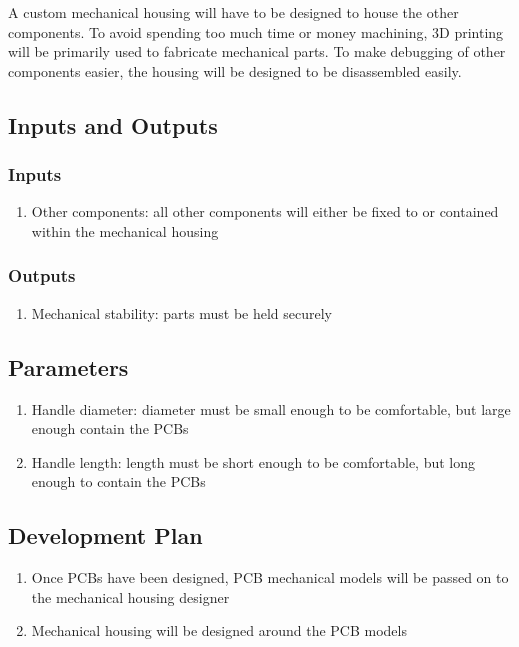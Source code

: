 \documentclass{notes}
\begin{document}
A custom mechanical housing will have to be designed to house the other components.
To avoid spending too much time or money machining, 3D printing will be primarily used to fabricate mechanical parts.
To make debugging of other components easier, the housing will be designed to be disassembled easily.

\subsection{Inputs and Outputs}

\subsubsection{Inputs}

\begin{enumerate}
    \item Other components: all other components will either be fixed to or contained within the mechanical housing
\end{enumerate}

\subsubsection{Outputs}

\begin{enumerate}
    \item Mechanical stability: parts must be held securely
\end{enumerate}

\subsection{Parameters}

\begin{enumerate}
    \item Handle diameter: diameter must be small enough to be comfortable, but large enough contain the PCBs
    \item Handle length: length must be short enough to be comfortable, but long enough to contain the PCBs
\end{enumerate}

\subsection{Development Plan}

\begin{enumerate}
    \item Once PCBs have been designed, PCB mechanical models will be passed on to the mechanical housing designer
    \item Mechanical housing will be designed around the PCB models
\end{enumerate}
\end{document}
